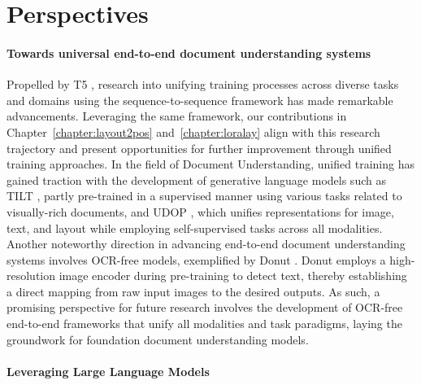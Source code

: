 
\section{Perspectives}

\paragraph{Towards universal end-to-end document understanding systems}

Propelled by \ac{T5} \citep{raffel2020exploring}, research into unifying training processes across diverse tasks and domains using the sequence-to-sequence framework has made remarkable advancements. Leveraging the same framework, our contributions in Chapter~\ref{chapter:layout2pos} and~\ref{chapter:loralay} align with this research trajectory and present opportunities for further improvement through unified training approaches. In the field of Document Understanding, unified training has gained traction with the development of generative language models such as TILT \citep{powalski2021going}, partly pre-trained in a supervised manner using various tasks related to visually-rich documents, and UDOP \citep{tang2023unifying}, which unifies representations for image, text, and layout while employing self-supervised tasks across all modalities. Another noteworthy direction in advancing end-to-end document understanding systems involves \ac{OCR}-free models, exemplified by Donut \citep{kim2022ocr}. Donut employs a high-resolution image encoder during pre-training to detect text, thereby establishing a direct mapping from raw input images to the desired outputs. As such, a promising perspective for future research involves the development of \ac{OCR}-free end-to-end frameworks that unify all modalities and task paradigms, laying the groundwork for foundation document understanding models.

\paragraph{Leveraging Large Language Models}

